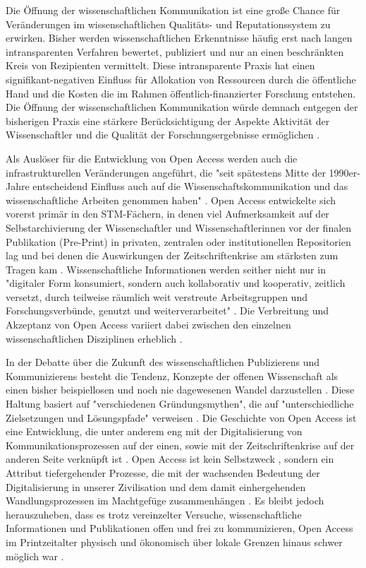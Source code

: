 Die Öffnung der wissenschaftlichen Kommunikation ist eine große Chance für Veränderungen im wissenschaftlichen Qualitäts- und Reputationssystem zu erwirken. Bisher werden wissenschaftlichen Erkenntnisse häufig erst nach langen intransparenten Verfahren bewertet, publiziert und nur an einen beschränkten Kreis von Rezipienten vermittelt. Diese intransparente Praxis hat einen signifikant-negativen Einfluss für Allokation von Ressourcen durch die öffentliche Hand und die Kosten die im Rahmen öffentlich-finanzierter Forschung entstehen. Die Öffnung der wissenschaftlichen Kommunikation würde demnach entgegen der bisherigen Praxis eine stärkere Berücksichtigung der Aspekte Aktivität der Wissenschaftler und die Qualität der Forschungsergebnisse ermöglichen \cite{suchen}.

Als Auslöser für die Entwicklung von Open Access werden auch die infrastrukturellen Veränderungen angeführt, die "seit spätestens Mitte der 1990er-Jahre entscheidend Einfluss auch auf die Wissenschaftskommunikation und das wissenschaftliche Arbeiten genommen haben" \cite{schulze_2013_open}. Open Access entwickelte sich vorerst primär in den STM-Fächern, in denen viel Aufmerksamkeit auf der Selbstarchivierung der Wissenschaftler und Wissenschaftlerinnen vor der finalen Publikation (Pre-Print) in privaten, zentralen oder institutionellen Repositorien lag \cite{adema_2013_political} und bei denen die Auswirkungen der Zeitschriftenkrise am stärksten zum Tragen kam \cite{naeder_2010_open}. Wissenschaftliche Informationen werden seither nicht nur in "digitaler Form konsumiert, sondern auch kollaborativ und kooperativ, zeitlich versetzt, durch teilweise räumlich weit verstreute Arbeitsgruppen und Forschungsverbünde, genutzt und weiterverarbeitet" \cite{schulze_2013_open}. Die Verbreitung und Akzeptanz von Open Access variiert dabei zwischen den einzelnen wissenschaftlichen Disziplinen erheblich \cite{cite:21a}.

In der Debatte über die Zukunft des wissenschaftlichen Publizierens und Kommunizierens besteht die Tendenz, Konzepte der offenen Wissenschaft als einen bisher beispiellosen und noch nie dagewesenen Wandel darzustellen \cite{cite:17a} \cite{cite:17b}. Diese Haltung basiert auf "verschiedenen Gründungsmythen", die auf "unterschiedliche Zielsetzungen und Lösungspfade" verweisen \cite{suchen-Hoffmann-Zugang-undVerwertung-oeffentlicher-Informationen}. Die Geschichte von Open Access ist eine Entwicklung, die unter anderem eng mit der Digitalisierung von Kommunikationsprozessen auf der einen, sowie mit der Zeitschriftenkrise auf der anderen Seite verknüpft ist \cite{suchen-Hoffmann-Zugang-undVerwertung-oeffentlicher-Informationen} \cite{yiotis_2013_open} \cite{wein_2010_erwerbung}. Open Access ist kein Selbstzweck \cite{cite:17d}, sondern ein Attribut tiefergehender Prozesse, die mit der wachsenden Bedeutung der Digitalisierung in unserer Zivilisation und dem damit einhergehenden Wandlungsprozessen im Machtgefüge zusammenhängen \cite{cite:17e}. Es bleibt jedoch herauszuheben, dass es trotz vereinzelter Versuche, wissenschaftliche Informationen und Publikationen offen und frei zu kommunizieren, Open Access im Printzeitalter physisch und ökonomisch über lokale Grenzen hinaus schwer möglich war \cite{cite:18a}.


